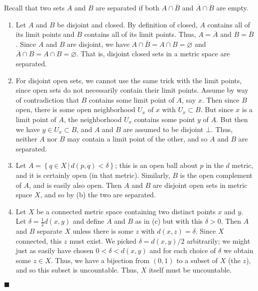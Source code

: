 \documentclass[12pt]{article}
\renewcommand{\qed}{\hfill$\blacksquare$}
\renewenvironment{proof}{\begin{addmargin}[1em]{0em}\begin{newproof}}{\end{newproof}\end{addmargin}\qed}
\begin{document}
\begin{proof}
{\color{red}Recall that two sets $A$ and $B$ are separated if both $A\cap \overline{B}$ and $\overline{A}\cap B$ are empty.}
\begin{enumerate}[label=(\alph*)]
	\item Let $A$ and $B$ be disjoint and closed. By definition of closed, $A$ contains all of its limit points and $B$ contains all of its limit points. Thus, $A=\overline{A}$ and $B=\overline{B}$. Since $A$ and $B$ are disjoint, we have $A\cap \overline{B} = A\cap B = \varnothing$ and $\overline{A}\cap B = A\cap B = \varnothing$. That is, disjoint closed sets in a metric space are separated.
	\item {\color{red}For disjoint open sets, we cannot use the same trick with the limit points, since open sets do not necessarily contain their limit points.} Assume by way of contradiction that $B$ contains some limit point of $A$, say $x$. Then since $B$ open, there is some open neighborhood $U_x$ of $x$ with $U_x \subset B$. But since $x$ is a limit point of $A$, the neighborhood $U_x$ contains some point $y$ of $A$. But then we have $y \in U_x \subset B$, and $A$ and $B$ are assumed to be disjoint $\bot$. Thus, neither $A$ nor $B$ may contain a limit point of the other, and so $A$ and $B$ are separated.
	\item Let $A= \left\{ q\in X\, | \, d\left(p,q\right) < \delta \right\}${\color{red}; this is an open ball about $p$ in the $d$ metric, and it is certainly open (in that metric)}. Similarly, $B$ is the open complement of $A$, and is easily also open. Then $A$ and $B$ are disjoint open sets in metric space $X$, and so by (b) the two are separated.
	\item Let $X$ be a connected metric space containing two distinct points $x$ and $y$. Let $\delta = \frac{1}{2}d\left(x,y\right)$ and define $A$ and $B$ as in (c) but with this $\delta >0$. Then $A$ and $B$ separate $X$ unless there is some $z$ with $d\left(x,z\right) = \delta$. Since $X$ connected, this $z$ must exist. We picked $\delta = d\left(x,y\right)/2$ arbitrarily; we might just as easily have chosen $0<\delta <d\left(x,y\right)$ and for each choice of $\delta$ we obtain some $z\in X$. Thus, we have a bijection from $\left(0,1\right)$ to a subset of $X$ (the $z$), and so this subset is uncountable. Thus, $X$ itself must be uncountable.
\end{enumerate}
\end{proof}
\end{document}

